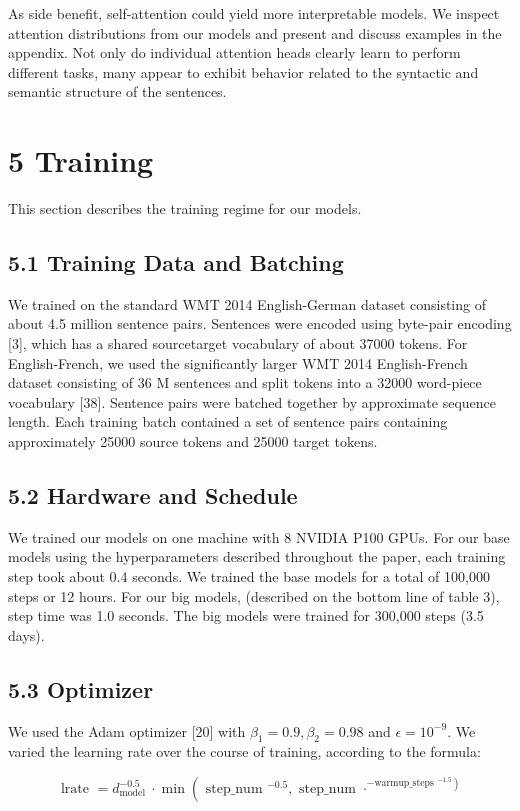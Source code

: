 \documentclass[10pt]{article}
\begin{document}
As side benefit, self-attention could yield more interpretable models. We inspect attention distributions from our models and present and discuss examples in the appendix. Not only do individual attention heads clearly learn to perform different tasks, many appear to exhibit behavior related to the syntactic and semantic structure of the sentences.

\section*{5 Training}
This section describes the training regime for our models.

\subsection*{5.1 Training Data and Batching}
We trained on the standard WMT 2014 English-German dataset consisting of about 4.5 million sentence pairs. Sentences were encoded using byte-pair encoding [3], which has a shared sourcetarget vocabulary of about 37000 tokens. For English-French, we used the significantly larger WMT 2014 English-French dataset consisting of 36 M sentences and split tokens into a 32000 word-piece vocabulary [38]. Sentence pairs were batched together by approximate sequence length. Each training batch contained a set of sentence pairs containing approximately 25000 source tokens and 25000 target tokens.

\subsection*{5.2 Hardware and Schedule}
We trained our models on one machine with 8 NVIDIA P100 GPUs. For our base models using the hyperparameters described throughout the paper, each training step took about 0.4 seconds. We trained the base models for a total of 100,000 steps or 12 hours. For our big models, (described on the bottom line of table 3), step time was 1.0 seconds. The big models were trained for 300,000 steps (3.5 days).

\subsection*{5.3 Optimizer}
We used the Adam optimizer [20] with $\beta_{1}=0.9, \beta_{2}=0.98$ and $\epsilon=10^{-9}$. We varied the learning rate over the course of training, according to the formula:

\[
\text { lrate }=d_{\text {model }}^{-0.5} \cdot \min \left(\text { step_num }^{-0.5}, \text { step_num } \cdot^{\left.- \text {warmup_steps }^{-1.5}\right)}\right.
\]
\end{document}
